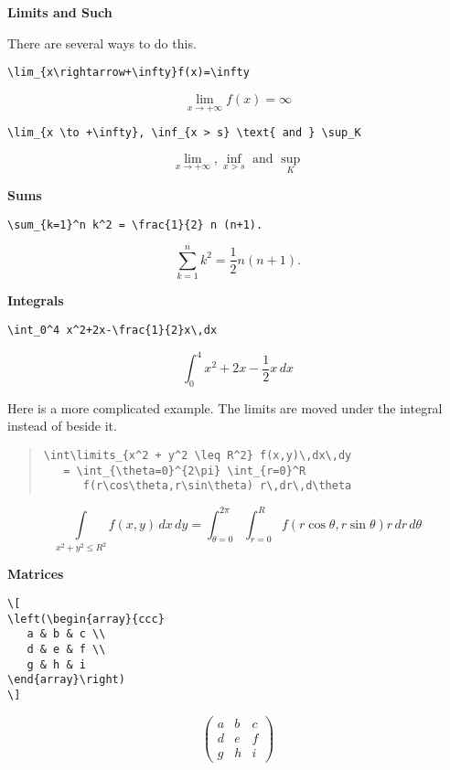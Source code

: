 \documentclass[letterpaper,twoside,10pt]{article}
\begin{document}
\bigbreak\textbf{Limits and Such}

There are several ways to do this.

\begin{multicols}{2}
\small{\begin{verbatim}
\lim_{x\rightarrow+\infty}f(x)=\infty
\end{verbatim}}
\[
\lim_{x\rightarrow+\infty}f(x)=\infty
\]
\end{multicols}

\begin{multicols}{2}
\small{\begin{verbatim}
\lim_{x \to +\infty}, \inf_{x > s} \text{ and } \sup_K
\end{verbatim}}
\[
\lim_{x \to +\infty}, \inf_{x > s} \text{ and } \sup_K
\]
\end{multicols}

\bigbreak\textbf{Sums}

\begin{multicols}{2}
\small{\begin{verbatim}
\sum_{k=1}^n k^2 = \frac{1}{2} n (n+1).
\end{verbatim}}
\[
\sum_{k=1}^n k^2 = \frac{1}{2} n (n+1).
\]
\end{multicols}

\bigbreak\textbf{Integrals}

\begin{multicols}{2}
\small{\begin{verbatim}
\int_0^4 x^2+2x-\frac{1}{2}x\,dx
\end{verbatim}}
\[
\int_0^4 x^2+2x-\frac{1}{2}x\,dx
\]
\end{multicols}

Here is a more complicated example. The limits are moved under the integral instead of beside it.

\begin{quote}\small
\begin{verbatim}
\int\limits_{x^2 + y^2 \leq R^2} f(x,y)\,dx\,dy
   = \int_{\theta=0}^{2\pi} \int_{r=0}^R
      f(r\cos\theta,r\sin\theta) r\,dr\,d\theta
\end{verbatim}
\end{quote}

\[
\int\limits_{x^2 + y^2 \leq R^2} f(x,y)\,dx\,dy
   = \int_{\theta=0}^{2\pi} \int_{r=0}^R
      f(r\cos\theta,r\sin\theta) r\,dr\,d\theta
\]


\bigbreak\textbf{Matrices}

\begin{multicols}{2}
\small{\begin{verbatim}
\[
\left(\begin{array}{ccc}
   a & b & c \\
   d & e & f \\
   g & h & i
\end{array}\right)
\]
\end{verbatim}}
\vspace{2pc}
\[
\left(\begin{array}{ccc}
   a & b & c \\
   d & e & f \\
   g & h & i
\end{array}\right)
\]
\end{multicols}
\end{document}
